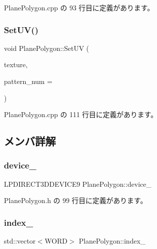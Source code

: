  Plane\+Polygon.\+cpp の 93 行目に定義があります。

\mbox{\label{class_plane_polygon_a081458fcb9e758dd8be5b027c66a92ad}} 
\subsubsection{\texorpdfstring{Set\+U\+V()}{SetUV()}}
{\footnotesize\ttfamily void Plane\+Polygon\+::\+Set\+UV (\begin{DoxyParamCaption}\item[{const \mbox{\hyperlink{class_texture_object}{Texture\+Object}} $\ast$}]{texture,  }\item[{const int}]{pattern\+\_\+num = {} }\end{DoxyParamCaption})}



 Plane\+Polygon.\+cpp の 111 行目に定義があります。



\subsection{メンバ詳解}
\mbox{\label{class_plane_polygon_a9b07736e5b36983967d0fac67c39dc82}} 
\subsubsection{\texorpdfstring{device\+\_\+}{device\_}}
{\footnotesize\ttfamily L\+P\+D\+I\+R\+E\+C\+T3\+D\+D\+E\+V\+I\+C\+E9 Plane\+Polygon\+::device\+\_\+\hspace{0.3cm}{\ttfamily [private]}}



 Plane\+Polygon.\+h の 99 行目に定義があります。

\mbox{\label{class_plane_polygon_a75b4c7fca8f0b25f11bd59da087b5a07}} 
\subsubsection{\texorpdfstring{index\+\_\+}{index\_}}
{\footnotesize\ttfamily std\+::vector$<$W\+O\+RD$>$ Plane\+Polygon\+::index\+\_\+\hspace{0.3cm}{\ttfamily [private]}}



